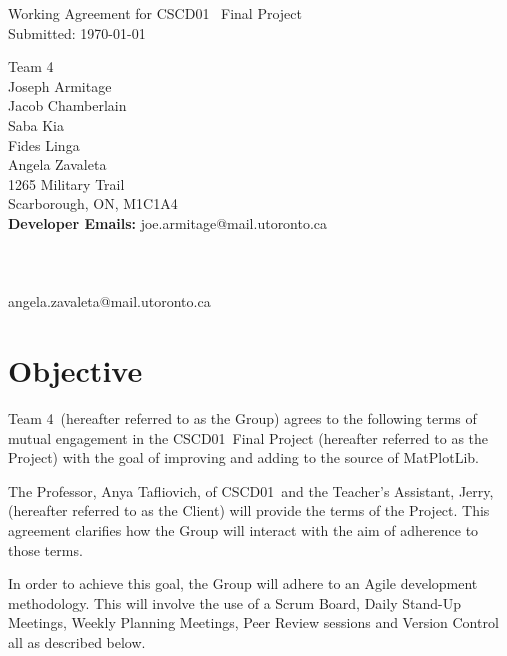 \documentclass[a4paper,12pt]{article} %
\makeatletter
\newcommand{\YourName}{
Joseph Armitage \\
Jacob Chamberlain \\
Saba Kia \\
Fides Linga \\
Angela Zavaleta}
\newcommand{\CompanyName}{Team 4}
\newcommand{\AddressLineOne}{1265 Military Trail}
\newcommand{\AddressLineTwo}{Scarborough, ON, M1C1A4}
\newcommand{\YourEmail}{
joe.armitage@mail.utoronto.ca \\
 \\
 \\
 \\
angela.zavaleta@mail.utoronto.ca
}
\newcommand{\ClientName}{CSCD01}
\newcommand{\ProfName}{Anya Tafliovich}
\newcommand{\TAName}{Jerry}
\newcommand{\Project}{MatPlotLib}
\makeatother
\begin{document}

\begin{titlepage}

\vspace*{\fill} %

\begin{center}

{\LARGE Working Agreement for \ClientName ~ Final Project}\\ [1.5cm]

Submitted: \today

\end{center}

\CompanyName\\

\YourName\\

\AddressLineOne \\
\AddressLineTwo \\

\textbf{Developer Emails:} \YourEmail

\vspace*{\fill} %

\end{titlepage}


\section{Objective}

\CompanyName~(hereafter referred to as the Group) agrees to the following terms of mutual engagement in the \ClientName ~Final Project (hereafter referred to as the Project) with the goal of improving and adding to the source of \Project.

The Professor, \ProfName, of \ClientName~and the Teacher's Assistant, \TAName, (hereafter referred to as the Client) will provide the terms of the Project. This agreement clarifies how the Group will interact with the aim of adherence to those terms.

In order to achieve this goal, the Group will adhere to an Agile development methodology. This will involve the use of a Scrum Board, Daily Stand-Up Meetings, Weekly Planning Meetings, Peer Review sessions and Version Control all as described below.
\end{document}
